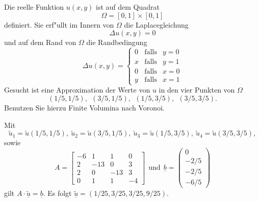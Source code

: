 Die reelle Funktion $u(x,y)$ ist auf dem Quadrat
\[
\Omega = [0, 1] \times [0,1]
\]
definiert. Sie erf"ullt im Innern von $\Omega$ die Laplacegleichung
\[
\Delta u(x,y) = 0
\]
und auf dem Rand von $\Omega$ die Randbedingung
\[
\Delta u(x,y) = \left\{
\begin{array}{ccl}
0 & \text{falls} & y = 0 \\
x & \text{falls} & y = 1 \\
0 & \text{falls} & x = 0 \\
y & \text{falls} & x = 1
\end{array} \right.
\]
Gesucht ist eine Approximation der Werte von $u$ in den vier Punkten
von $\Omega$
\[
(1/5,1/5), \ \  (3/5,1/5), \ \ (1/5,3/5), \ \  (3/5,3/5).
\]
Benutzen Sie hierzu Finite Volumina nach Voronoi.  

\begin{loesung}
Mit
\[
\tilde u_1 = \tilde u(1/5,1/5), \ 
\tilde u_2 = \tilde u(3/5,1/5), \ 
\tilde u_3 = \tilde u(1/5,3/5), \ 
\tilde u_4 = \tilde u(3/5,3/5),
\]
sowie
\[
A
=
\left[
\begin{array}{rrrr}
-6 & 1 & 1 & 0 \\
 2 & -13 & 0 & 3 \\
 2 & 0 & -13 & 3 \\
 0 & 1 & 1 & -4
\end{array}
\right]
\ \ \text{und} \ \
\underline{b}
=
\begin{pmatrix}
0 \\ -2/5 \\ -2/5 \\ -6/5
\end{pmatrix}
\]
\vspace{5mm}  
gilt $A \cdot \underline{\tilde u} = \underline{b}$.
Es folgt $\underline{\tilde u} = (1/25, 3/25, 3/25, 9/25).$
\end{loesung}

